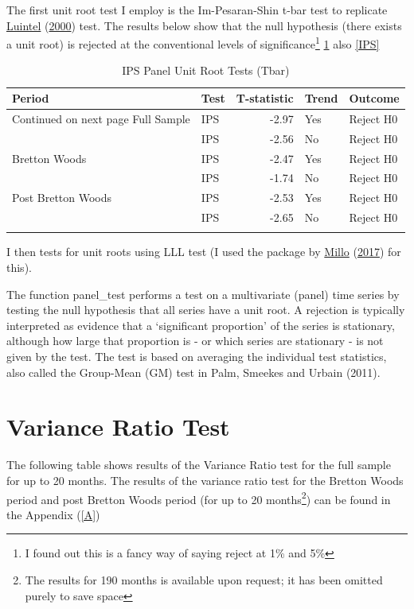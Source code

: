 \documentclass[11pt,preprint, authoryear]{elsarticle}
\numberwithin{equation}{section}
\numberwithin{figure}{section}
\numberwithin{table}{section}
\let\rmarkdownfootnote\footnote%
\def\footnote{\protect\rmarkdownfootnote}
\begin{document}
The first unit root test I employ is the Im-Pesaran-Shin t-bar test to
replicate \protect\hyperlink{ref-Kul}{Luintel}
(\protect\hyperlink{ref-Kul}{2000}) test. The results below show that
the null hypothesis (there exists a unit root) is rejected at the
conventional levels of significance\footnote{I found out this is a fancy
  way of saying reject at 1\% and 5\%} \ref{ips} also \ref{IPS}

\begingroup\fontsize{12pt}{13pt}\selectfont
\begin{longtable}{llrll}
\caption{IPS Panel Unit Root Tests (Tbar)} \\ 
  \toprule
Period & Test & T-statistic & Trend & Outcome \\ 
  \hline 
\endhead 
\hline 
{\footnotesize Continued on next page} 
\endfoot 
\endlastfoot 
 \midrule
Full Sample & IPS & -2.97 & Yes & Reject H0 \\ 
   & IPS & -2.56 & No & Reject H0 \\ 
  Bretton Woods & IPS & -2.47 & Yes & Reject H0 \\ 
   & IPS & -1.74 & No & Reject H0 \\ 
  Post Bretton Woods & IPS & -2.53 & Yes & Reject H0 \\ 
   & IPS & -2.65 & No & Reject H0 \\ 
   \bottomrule
\label{ips}
\end{longtable}
\endgroup

I then tests for unit roots using LLL test (I used the package by
\protect\hyperlink{ref-plm}{Millo} (\protect\hyperlink{ref-plm}{2017})
for this).

The function panel\_test performs a test on a multivariate (panel) time
series by testing the null hypothesis that all series have a unit root.
A rejection is typically interpreted as evidence that a `significant
proportion' of the series is stationary, although how large that
proportion is - or which series are stationary - is not given by the
test. The test is based on averaging the individual test statistics,
also called the Group-Mean (GM) test in Palm, Smeekes and Urbain (2011).

\hypertarget{variance-ratio-test}{%
\section{\texorpdfstring{Variance Ratio Test
\label{Var}}{Variance Ratio Test }}\label{variance-ratio-test}}

The following table shows results of the Variance Ratio test for the
full sample for up to 20 months. The results of the variance ratio test
for the Bretton Woods period and post Bretton Woods period (for up to 20
months\footnote{The results for 190 months is available upon request; it
  has been omitted purely to save space}) can be found in the Appendix
(\ref{A})
\end{document}
